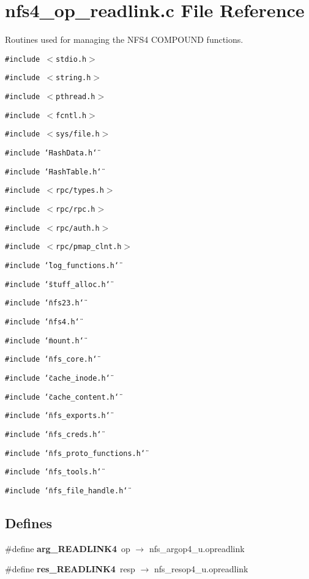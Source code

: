 \section{nfs4\_\-op\_\-readlink.c File Reference}
\label{nfs4__op__readlink_8c}
Routines used for managing the NFS4 COMPOUND functions. 

{\tt \#include $<$stdio.h$>$}\par
{\tt \#include $<$string.h$>$}\par
{\tt \#include $<$pthread.h$>$}\par
{\tt \#include $<$fcntl.h$>$}\par
{\tt \#include $<$sys/file.h$>$}\par
{\tt \#include \char`\"{}Hash\-Data.h\char`\"{}}\par
{\tt \#include \char`\"{}Hash\-Table.h\char`\"{}}\par
{\tt \#include $<$rpc/types.h$>$}\par
{\tt \#include $<$rpc/rpc.h$>$}\par
{\tt \#include $<$rpc/auth.h$>$}\par
{\tt \#include $<$rpc/pmap\_\-clnt.h$>$}\par
{\tt \#include \char`\"{}log\_\-functions.h\char`\"{}}\par
{\tt \#include \char`\"{}stuff\_\-alloc.h\char`\"{}}\par
{\tt \#include \char`\"{}nfs23.h\char`\"{}}\par
{\tt \#include \char`\"{}nfs4.h\char`\"{}}\par
{\tt \#include \char`\"{}mount.h\char`\"{}}\par
{\tt \#include \char`\"{}nfs\_\-core.h\char`\"{}}\par
{\tt \#include \char`\"{}cache\_\-inode.h\char`\"{}}\par
{\tt \#include \char`\"{}cache\_\-content.h\char`\"{}}\par
{\tt \#include \char`\"{}nfs\_\-exports.h\char`\"{}}\par
{\tt \#include \char`\"{}nfs\_\-creds.h\char`\"{}}\par
{\tt \#include \char`\"{}nfs\_\-proto\_\-functions.h\char`\"{}}\par
{\tt \#include \char`\"{}nfs\_\-tools.h\char`\"{}}\par
{\tt \#include \char`\"{}nfs\_\-file\_\-handle.h\char`\"{}}\par
\subsection*{Defines}
\begin{CompactItemize}
\item 
\#define {\bf arg\_\-READLINK4}\ op $\rightarrow$ nfs\_\-argop4\_\-u.opreadlink
\item 
\#define {\bf res\_\-READLINK4}\ resp $\rightarrow$ nfs\_\-resop4\_\-u.opreadlink
\end{CompactItemize}
